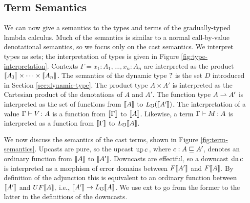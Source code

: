 \subsection{Term Semantics}\label{sec:term-interpretation}

We can now give a semantics to the types and terms of the gradually-typed lambda
calculus. 
%
Much of the semantics is similar to a normal call-by-value denotational
semantics, so we focus only on the cast semantics. We interpret types as sets;
the interpretation of types is given in Figure \ref{fig:type-interpretation}.
Contexts $\Gamma = x_1 \colon A_1, \dots, x_n \colon A_n$ are interpreted as the
product $\llbracket {A_1} \rrbracket \times \cdots \times \llbracket {A_n} \rrbracket$. The semantics of the dynamic
type $?$ is the set $D$ introduced in Section \ref{sec:dynamic-type}. The
product type $A \times A'$ is interpreted as the Cartesian product of the
denotations of $A$ and $A'$. The function type $A \rightharpoonup A'$ is interpreted as the
set of functions from $\llbracket {A} \rrbracket$ to $L_\mho (\llbracket {A'} \rrbracket)$.
%
The interpretation of a value ${\Gamma} \vdash {V} \colon {A}$ is a function from
$\llbracket {\Gamma} \rrbracket$ to $\llbracket {A} \rrbracket$. Likewise, a term ${\Gamma} \vdash {M} \colon {{A}}$ is
interpreted as a function from $\llbracket {\Gamma} \rrbracket$ to $L_\mho \llbracket {A} \rrbracket$.

We now discuss the semantics of the cast terms, shown in Figure
\ref{fig:term-semantics}. Upcasts are pure, so the upcast ${\text{up}\,{c}\,}$, where $c :
A \sqsubseteq A'$, denotes an ordinary function from $\llbracket {A} \rrbracket$ to $\llbracket {A'} \rrbracket$.
Downcasts are effectful, so a downcast ${\text{dn}\,{c}\,}$ is interpreted as a morphism
of error domains between $F\llbracket {A'} \rrbracket$ and $F\llbracket {A} \rrbracket$. By definition of the
adjunction this is equivalent to an ordinary function between $\llbracket {A'} \rrbracket$ and
$UF\llbracket {A} \rrbracket$, i.e., $\llbracket {A'} \rrbracket \to L_\mho \llbracket {A} \rrbracket$. We use $\text{ext}$ to go from
the former to the latter in the definitions of the downcasts.



